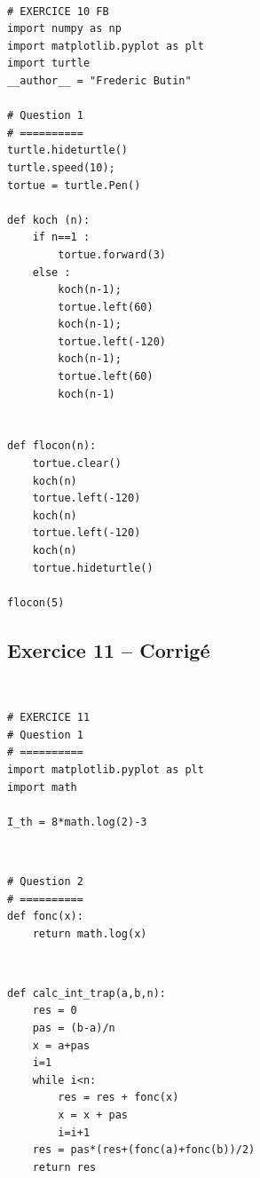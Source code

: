 \documentclass[10pt,fleqn]{article} %
\begin{document}
\begin{corrige}
$\quad$
\begin{lstlisting}
# EXERCICE 10 FB
import numpy as np
import matplotlib.pyplot as plt
import turtle
__author__ = "Frederic Butin"

# Question 1 
# ==========
turtle.hideturtle()
turtle.speed(10);
tortue = turtle.Pen()

def koch (n):
    if n==1 : 
        tortue.forward(3)
    else : 
        koch(n-1);
        tortue.left(60)
        koch(n-1);
        tortue.left(-120)
        koch(n-1);
        tortue.left(60)
        koch(n-1)
        

def flocon(n):
    tortue.clear()
    koch(n)
    tortue.left(-120)
    koch(n)
    tortue.left(-120)
    koch(n)
    tortue.hideturtle()

flocon(5)
\end{lstlisting}
\end{corrige}



\subsection*{Exercice 11 -- Corrigé}

\begin{corrige}
$\quad$
\begin{lstlisting}
# EXERCICE 11
# Question 1 
# ==========
import matplotlib.pyplot as plt
import math

I_th = 8*math.log(2)-3
\end{lstlisting}
\end{corrige}

\begin{corrige}
$\quad$
\begin{lstlisting}
# Question 2
# ==========
def fonc(x):
    return math.log(x)
\end{lstlisting}
\end{corrige}


\begin{corrige}
$\quad$
\begin{lstlisting}    
def calc_int_trap(a,b,n):
    res = 0
    pas = (b-a)/n
    x = a+pas
    i=1
    while i<n:
        res = res + fonc(x)
        x = x + pas
        i=i+1
    res = pas*(res+(fonc(a)+fonc(b))/2)
    return res
\end{lstlisting}
\end{corrige}
\end{document}

